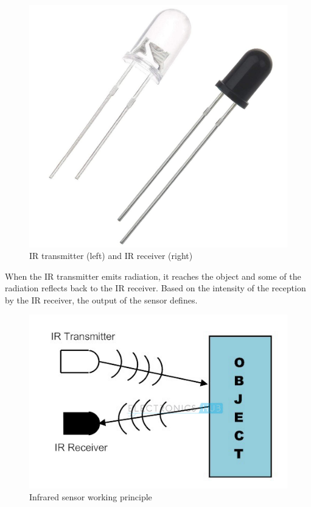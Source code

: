 \documentclass[a4paper,twoside]{report}
\begin{document}
\begin{figure}[H]
\centering
\includegraphics[scale=0.09]{images/ir_trans_recev.jpg}
\caption{IR transmitter (left) and IR receiver (right)}
\end{figure}

When the IR transmitter emits radiation, it reaches the object and some of the radiation reflects back to the IR receiver. Based on the intensity of the reception by the IR receiver, the output of the sensor defines.
\begin{figure}[H]
\centering
\includegraphics[scale=0.5]{images/ir_principle.jpg}
\caption{Infrared sensor working principle\protect\footnotemark}
\end{figure}
\end{document}
